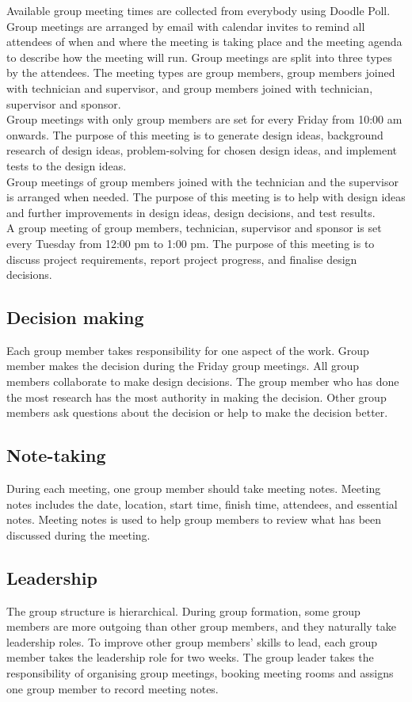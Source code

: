\documentclass[9pt, a4paper]{report}
\begin{document}
	Available group meeting times are collected from everybody using Doodle Poll. Group meetings are arranged by email with calendar invites to remind all attendees of when and where the meeting is taking place and the meeting agenda to describe how the meeting will run. Group meetings are split into three types by the attendees. The meeting types are group members, group members joined with technician and supervisor, and group members joined with technician, supervisor and sponsor. \\
	
	Group meetings with only group members are set for every Friday from 10:00 am onwards. The purpose of this meeting is to generate design ideas, background research of design ideas, problem-solving for chosen design ideas, and implement tests to the design ideas. \\
			
			Group meetings of group members joined with the technician and the supervisor is arranged when needed. The purpose of this meeting is to help with design ideas and further improvements in design ideas, design decisions, and test results.\\
			
			A group meeting of group members, technician, supervisor and sponsor is set every Tuesday from 12:00 pm to 1:00 pm. The purpose of this meeting is to discuss project requirements, report project progress, and finalise design decisions.
		\subsection*{Decision making}
			Each group member takes responsibility for one aspect of the work. Group member makes the decision during the Friday group meetings. All group members collaborate to make design decisions. The group member who has done the most research has the most authority in making the decision. Other group members ask questions about the decision or help to make the decision better.  
		\subsection*{Note-taking}
			During each meeting, one group member should take meeting notes. Meeting notes includes the date, location, start time, finish time, attendees, and essential notes. Meeting notes is used to help group members to review what has been discussed during the meeting.  
		\subsection*{Leadership}
			The group structure is hierarchical. During group formation,  some group members are more outgoing than other group members, and they naturally take leadership roles. To improve other group members’ skills to lead, each group member takes the leadership role for two weeks. The group leader takes the responsibility of organising group meetings, booking meeting rooms and assigns one group member to record meeting notes.
\end{document}
